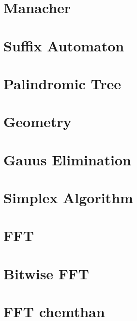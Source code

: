\section{Manacher}
\raggedbottom
\hrulefill

\section{Suffix Automaton}
\raggedbottom
\hrulefill


\section{Palindromic Tree}
\raggedbottom
\hrulefill

\section{Geometry}
\raggedbottom
\hrulefill

\section{Gauus Elimination}
\raggedbottom
\hrulefill

\section{Simplex Algorithm}
\raggedbottom
\hrulefill

\section{FFT}
\raggedbottom
\hrulefill

\section{Bitwise FFT}
\raggedbottom
\hrulefill

\section{FFT chemthan}
\raggedbottom
\hrulefill

